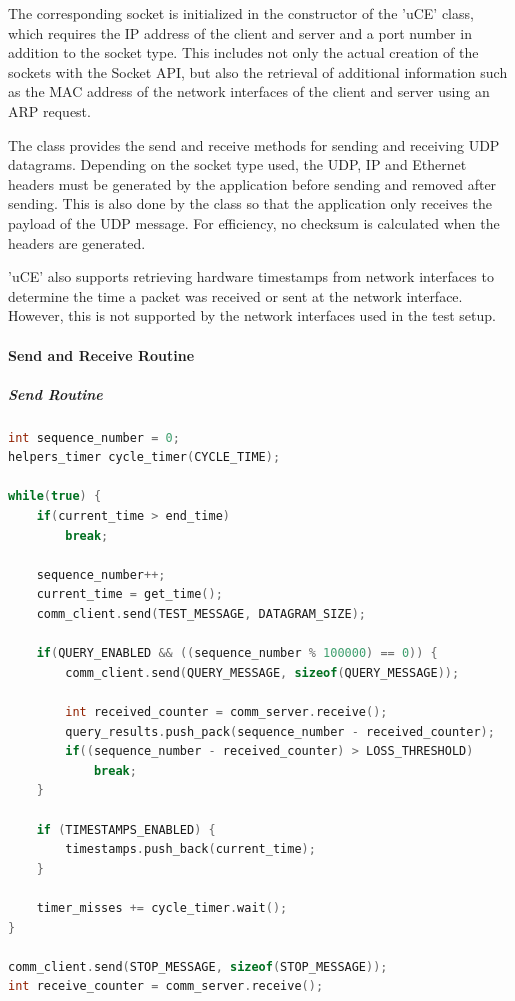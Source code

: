 The corresponding socket is initialized in the constructor of the 'uCE' class, which requires the IP address of the client and server and a port number in addition to the socket type. This includes not only the actual creation of the sockets with the Socket API, but also the retrieval of additional information such as the MAC address of the network interfaces of the client and server using an ARP request.

The class provides the send and receive methods for sending and receiving UDP datagrams. Depending on the socket type used, the UDP, IP and Ethernet headers must be generated by the application before sending and removed after sending. This is also done by the class so that the application only receives the payload of the UDP message. For efficiency, no checksum is calculated when the headers are generated.

'uCE' also supports retrieving hardware timestamps from network interfaces to determine the time a packet was received or sent at the network interface. However, this is not supported by the network interfaces used in the test setup.

\paragraph{Send and Receive Routine}
\subparagraph{Send Routine}

\begin{lstlisting}[language=C++, caption=Simplified Code of the Send Routine., label=lst:sendcode]
int sequence_number = 0;
helpers_timer cycle_timer(CYCLE_TIME);

while(true) {
    if(current_time > end_time)
        break;

    sequence_number++;
    current_time = get_time();
    comm_client.send(TEST_MESSAGE, DATAGRAM_SIZE);

    if(QUERY_ENABLED && ((sequence_number % 100000) == 0)) {
        comm_client.send(QUERY_MESSAGE, sizeof(QUERY_MESSAGE));
          
        int received_counter = comm_server.receive();
        query_results.push_pack(sequence_number - received_counter);
        if((sequence_number - received_counter) > LOSS_THRESHOLD)
            break;
    }
  
    if (TIMESTAMPS_ENABLED) {
        timestamps.push_back(current_time);
    }

    timer_misses += cycle_timer.wait();
}

comm_client.send(STOP_MESSAGE, sizeof(STOP_MESSAGE));
int receive_counter = comm_server.receive();
\end{lstlisting}

